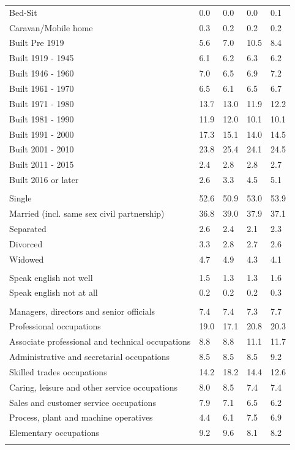 \documentclass{article}
\begin{document}
\begin{table}[h]
\begin{tabular}{KTTTT}
Bed-Sit & 0.0& 0.0& 0.0& 0.1\\
Caravan/Mobile home & 0.3& 0.2& 0.2& 0.2\\
    \hline
Built Pre 1919 &  5.6&  7.0& 10.5&  8.4\\
Built 1919 - 1945 & 6.1& 6.2& 6.3& 6.2\\
Built  1946 - 1960 & 7.0& 6.5& 6.9& 7.2\\
Built  1961 - 1970 & 6.5& 6.1& 6.5& 6.7\\
Built  1971 - 1980 & 13.7& 13.0& 11.9& 12.2\\
Built  1981 - 1990 & 11.9& 12.0& 10.1& 10.1\\
Built  1991 - 2000 & 17.3& 15.1& 14.0& 14.5\\
Built  2001 - 2010 & 23.8& 25.4& 24.1& 24.5\\
Built  2011 - 2015 & 2.4& 2.8& 2.8& 2.7\\
Built  2016 or later & 2.6& 3.3& 4.5& 5.1\\
\hline
    \\
    \hline
Single & 52.6& 50.9& 53.0& 53.9\\
Married (incl. same sex civil partnership) & 36.8& 39.0& 37.9& 37.1\\
Separated  & 2.6& 2.4& 2.1& 2.3\\
Divorced  & 3.3& 2.8& 2.7& 2.6\\
Widowed & 4.7& 4.9& 4.3& 4.1\\
\hline
    \\ 
    \hline
Speak english not well & 1.5& 1.3& 1.3& 1.6\\
Speak english not at all & 0.2& 0.2& 0.2& 0.3\\
\hline
    \\
    \hline
Managers, directors and senior officials & 7.4& 7.4& 7.3& 7.7\\
Professional occupations & 19.0& 17.1& 20.8& 20.3\\
Associate professional and technical occupations &  8.8&  8.8& 11.1& 11.7\\
Administrative and secretarial occupations & 8.5& 8.5& 8.5& 9.2\\
Skilled trades occupations & 14.2& 18.2& 14.4& 12.6\\
Caring, leisure and other service occupations & 8.0& 8.5& 7.4& 7.4\\
Sales and customer service occupations & 7.9& 7.1& 6.5& 6.2\\
Process, plant and machine operatives & 4.4& 6.1& 7.5& 6.9\\
Elementary occupations & 9.2& 9.6& 8.1& 8.2\\
\hline
\end{tabular}
\end{table}
\end{document}
